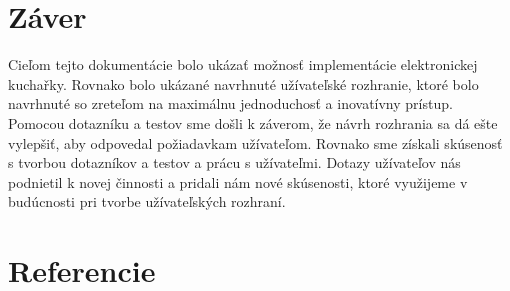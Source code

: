 \documentclass[12pt,a4paper,titlepage,final]{article}
\begin{document}
\section{Záver}
Cieľom tejto dokumentácie bolo ukázať možnosť implementácie elektronickej kuchařky. Rovnako bolo ukázané navrhnuté užívateľské rozhranie, ktoré bolo navrhnuté so zreteľom na maximálnu jednoduchosť a inovatívny prístup. Pomocou dotazníku a testov sme došli k záverom, že návrh rozhrania sa dá ešte vylepšiť, aby odpovedal požiadavkam užívateľom. Rovnako sme získali skúsenosť s tvorbou dotazníkov a testov a prácu s užívateľmi. Dotazy užívateľov nás podnietil k novej činnosti a pridali nám nové skúsenosti, ktoré využijeme v budúcnosti pri tvorbe užívateľských rozhraní.
\newpage

\section{Referencie}





\end{document}
